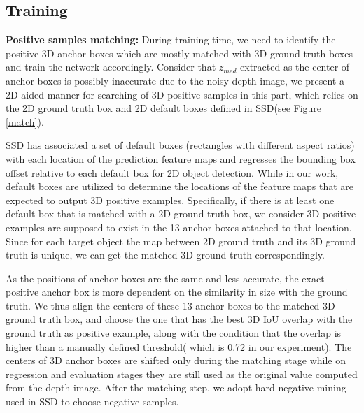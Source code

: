 \documentclass[10pt,twocolumn,letterpaper]{article}
\begin{document}
	\subsection{Training}
	\noindent\textbf{Positive samples matching:} During training time, we need to identify the positive 3D anchor boxes which are mostly matched with 3D ground truth boxes and train the network accordingly. Consider that $z_{med}$ extracted as the center of anchor boxes is possibly inaccurate due to the noisy depth image, we present a 2D-aided manner for searching of 3D positive samples in this part, which relies on the 2D ground truth box and 2D default boxes defined in SSD\cite{Wei2016SSD}(see Figure \ref{match}).\par
	SSD \cite{Wei2016SSD} has associated a set of default boxes (rectangles with different aspect ratios) with each location of the prediction feature maps and regresses the bounding box offset relative to each default box for 2D object detection. While in our work, default boxes are utilized to determine the locations of the feature maps that are expected to output 3D positive examples. Specifically, if there is at least one default box that is matched with a 2D ground truth box, we consider 3D positive examples are supposed to exist in the 13 anchor boxes attached to that location. Since for each target object the map between 2D ground truth and its 3D ground truth is unique, we can  get the matched 3D ground truth correspondingly. \par
	As the positions of anchor boxes are the same and less accurate, the exact positive anchor box is more dependent on the similarity in size with the ground truth.
	We thus align the centers of these 13 anchor boxes to the matched 3D ground truth box, and choose the one that has the best 3D IoU overlap with the ground truth as positive example, along with the condition that the overlap is higher than a manually defined threshold( which is 0.72 in our experiment). The centers of 3D anchor boxes are shifted only during the matching stage while on regression and evaluation stages they are still used as the original value computed from the depth image. 
	After the matching step, we adopt hard negative mining used in SSD \cite{Wei2016SSD} to choose negative samples.\par
	
\end{document}
